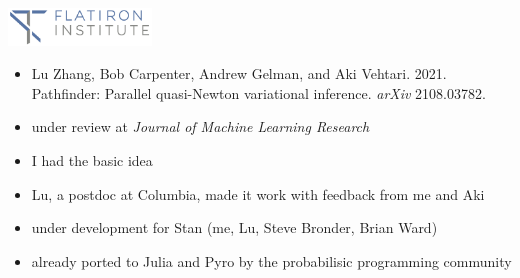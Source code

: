 \documentclass[9pt]{report}
\begin{document}
\sf%
\mbox{ }
\\[12pt]
\spc{{\LARGE\bfseries \color{MidnightBlue}{Pathfinder: }}}
\\[8pt]
\spc{\LARGE\bfseries \color{MidnightBlue}{Quasi-Newton variational inference}}
\\[36pt]
\noindent 
\spc{\large\bfseries \color{MidnightBlue}{Bob Carpenter}}
\\[2pt]
\\[2pt]
\vfill 
\noindent 
{}
\hfill 
\includegraphics[width=1.5in]{img/flatiron_logo.png}

\begin{itemize}
\item Lu Zhang, Bob Carpenter, Andrew Gelman, and Aki Vehtari. 2021. Pathfinder: Parallel quasi-Newton variational inference. \textit{arXiv} 2108.03782.
\item under review at \textit{Journal of Machine Learning Research}
\item I had the basic idea
\item Lu, a postdoc at Columbia, made it work with feedback from me and Aki
\item under development for Stan (me, Lu, Steve Bronder, Brian Ward)
\item already ported to Julia and Pyro by the probabilisic programming community
\end{itemize}
\end{document}
